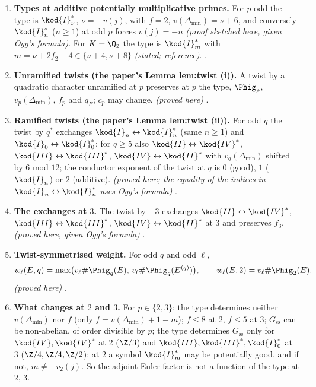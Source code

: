 \begin{enumerate}[label=\textbf{\thechapter.\arabic*}]
.
\item \textbf{Types at additive potentially multiplicative primes.} For $p$ odd the type is $\kod{I}_\nu^*$, $\nu=-v(j)$, with $f=2$,
$v(\Delta_{\min})=\nu+6$, and conversely $\kod{I}_n^*$ ($n\ge1$) at odd $p$ forces $v(j)=-n$ \emph{(proof sketched here, given Ogg's formula)}.
For $K=\Q_2$ the type is $\kod{I}_m^*$ with $m=\nu+2f_2-4\in\{\nu+4,\nu+8\}$ \emph{(stated; reference)}. .
\item \textbf{Unramified twists (the paper's Lemma lem:twist (i)).} A twist by a quadratic character unramified at $p$ preserves at $p$ the type,
$\Phig_p$, $v_p(\Delta_{\min})$, $f_p$ and $q_E$; $c_p$ may change. \emph{(proved here)} .
\item \textbf{Ramified twists (the paper's Lemma lem:twist (ii)).} For odd $q$ the twist by $q^*$ exchanges $\kod{I}_n\leftrightarrow\kod{I}_n^*$ (same
$n\ge1$) and $\kod{I}_0\leftrightarrow\kod{I}_0^*$; for $q\ge5$ also $\kod{II}\leftrightarrow\kod{IV}^*$, $\kod{III}\leftrightarrow\kod{III}^*$,
$\kod{IV}\leftrightarrow\kod{II}^*$ with $v_q(\Delta_{\min})$ shifted by $6$ mod $12$; the conductor exponent of the twist at $q$ is $0$ (good), $1$
($\kod{I}_n$) or $2$ (additive). \emph{(proved here; the equality of the indices in $\kod{I}_n\leftrightarrow\kod{I}_n^*$ uses Ogg's formula)}
.
\item \textbf{The exchanges at $3$.} The twist by $-3$ exchanges $\kod{II}\leftrightarrow\kod{IV}^*$, $\kod{III}\leftrightarrow\kod{III}^*$,
$\kod{IV}\leftrightarrow\kod{II}^*$ at $3$ and preserves $f_3$. \emph{(proved here, given Ogg's formula)} .
\item \textbf{Twist-symmetrised weight.} For odd $q$ and odd $\ell$,
\[
w_\ell(E,q)=\max\bigl(v_\ell\#\Phig_q(E),\,v_\ell\#\Phig_q(E^{(q)})\bigr),\qquad w_\ell(E,2)=v_\ell\#\Phig_2(E).
\] \emph{(proved here)} .
\item \textbf{What changes at $2$ and $3$.} For $p\in\{2,3\}$: the type determines neither $v(\Delta_{\min})$ nor $f$ (only
$f=v(\Delta_{\min})+1-m$); $f\le8$ at $2$, $f\le5$ at $3$; $G_{\mathrm{ss}}$ can be non-abelian, of order divisible by $p$; the type determines
$G_{\mathrm{ss}}$ only for $\kod{IV},\kod{IV}^*$ at $2$ ($\Z/3$) and $\kod{III},\kod{III}^*,\kod{I}_0^*$ at $3$ ($\Z/4,\Z/4,\Z/2$); at $2$ a symbol
$\kod{I}_m^*$ may be potentially good, and if not, $m\ne-v_2(j)$. So the adjoint Euler factor is not a function of the type at $2$, $3$.

\end{enumerate}
